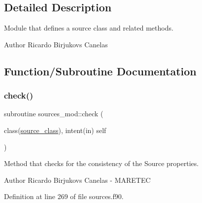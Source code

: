 \subsection{Detailed Description}
Module that defines a source class and related methods. 

\begin{DoxyAuthor}{Author}
Ricardo Birjukovs Canelas 
\end{DoxyAuthor}


\subsection{Function/\+Subroutine Documentation}
\mbox{\label{namespacesources__mod_a6fcfcb690cd1b9375915b01f7ddbe801}} 
\subsubsection{\texorpdfstring{check()}{check()}}
{\footnotesize\ttfamily subroutine sources\+\_\+mod\+::check (\begin{DoxyParamCaption}\item[{class(\mbox{\hyperlink{structsources__mod_1_1source__class}{source\+\_\+class}}), intent(in)}]{self }\end{DoxyParamCaption})\hspace{0.3cm}{\ttfamily [private]}}



Method that checks for the consistency of the Source properties. 

\begin{DoxyAuthor}{Author}
Ricardo Birjukovs Canelas -\/ M\+A\+R\+E\+T\+EC 
\end{DoxyAuthor}


Definition at line 269 of file sources.\+f90.


